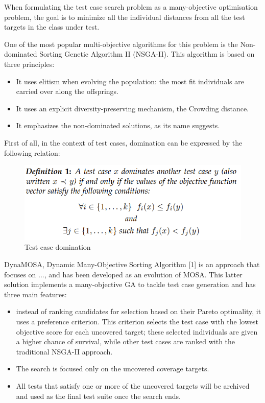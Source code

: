 When formulating the test case search problem as a many-objective optimisation problem, the goal is to minimize all the individual
distances from all the test targets in the class under test.


One of the most popular multi-objective algorithms for this problem is the Non-dominated Sorting Genetic Algorithm II (NSGA-II).
This algorithm is based on three principles:
\begin{itemize}
    \item It uses elitism when evolving the population: the most fit individuals are carried over along the offsprings.
    \item It uses an explicit diversity-preserving mechanism, the Crowding distance.
    \item It emphasizes the non-dominated solutions, as its name suggests.
\end{itemize}

First of all, in the context of test cases, domination can be expressed by the following relation:
\begin{figure}[htbp]
    \centering
    \includegraphics[scale=0.7]{./figures/test_Case_domination.PNG}
    \caption{Test case domination}
    \label{fig:test case domination}
\end{figure}


DynaMOSA, Dynamic Many-Objective Sorting Algorithm [1] is an approach that focuses on ..., and has been developed as an evolution 
of MOSA. This latter solution implements a many-objective GA to tackle test case generation and has three main features: 
\begin{itemize}
    \item instead of ranking candidates for selection based on their Pareto optimality, it uses a preference criterion.
        This criterion selects the test case with the lowest objective score for each uncovered target; these selected individuals
        are given a higher chance of survival, while other test cases are ranked with the traditional NSGA-II approach.
    \item The search is focused only on the uncovered coverage targets.
    \item All tests that satisfy one or more of the uncovered targets will be archived and used as the final test suite once the search ends.
\end{itemize}

